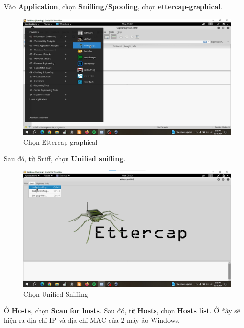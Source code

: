 \newpage

 Vào \textbf{Application}, chọn \textbf{Sniffing/Spoofing}, chọn \textbf{ettercap-graphical}. 

\begin{figure}[!htb]
    \centering
    \includegraphics[width=1\linewidth]{figure//chapter5//lab5_3/ettercap_graphical.png}
    \caption{Chọn Ettercap-graphical}
    \label{fig:enter-label}
\end{figure}

Sau đó, từ Sniff, chọn \textbf{Unified sniffing}.

\begin{figure}[!htb]
    \centering
    \includegraphics[width=1\linewidth]{figure//chapter5//lab5_3/sniffing.png}
    \caption{Chọn Unified Sniffing}
    \label{fig:enter-label}
\end{figure}

\newpage

 Ở \textbf{Hosts}, chọn \textbf{Scan for hosts}. Sau đó, từ \textbf{Hosts}, chọn \textbf{Hosts list}. Ở đây sẽ hiện ra địa chỉ IP và địa chỉ MAC của 2 máy ảo Windows.


